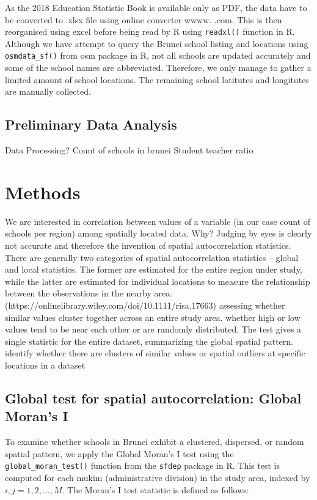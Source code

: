 \documentclass [12 pt]{article}
\begin{document}
As the 2018 Education Statistic Book is available only as PDF, the data have to be converted to .xlsx file using online converter wwww. .com. This is then reorganised using excel before being read by R using \texttt{readxl()} function in R. Although we have attempt to query the Brunei school listing and locations using \texttt{osmdata\_sf()} from osm package in R, not all schools are updated accurately and some of the school names are abbreviated. Therefore, we only manage to gather a limited amount of school locations. The remaining school latitutes and longitutes are manually collected. \\

\subsection{Preliminary Data Analysis}
Data Processing?
Count of schools in brunei
Student teacher ratio

\section{Methods}
We are interested in correlation between values of a variable (in our case count of schools per region) among spatially located data. Why? Judging by eyes is clearly not accurate and therefore the invention of spatial autocorrelation statistics. There are generally two categories of spatial autocorrelation statistics – global and local statistics. The former are estimated for the entire region under study, while the latter are estimated for individual locations to measure the relationship between the observations in the nearby area. (https://onlinelibrary.wiley.com/doi/10.1111/risa.17663)
assessing whether similar values cluster together across an entire study area. whether high or low values tend to be near each other or are randomly distributed. The test gives a single statistic for the entire dataset, summarizing the global spatial pattern.
identify whether there are clusters of similar values or spatial outliers at specific locations in a dataset


\subsection{Global test for spatial autocorrelation: Global Moran's I}
To examine whether schools in Brunei exhibit a clustered, dispersed, or random spatial pattern, we apply the Global Moran’s I test using the \texttt{global\_moran\_test()} function from the \texttt{sfdep} package in R. This test is computed for each mukim (administrative division) in the study area, indexed by \( i, j = 1, 2, \dots, M \). The Moran’s I test statistic is defined as follows: 
\end{document}
